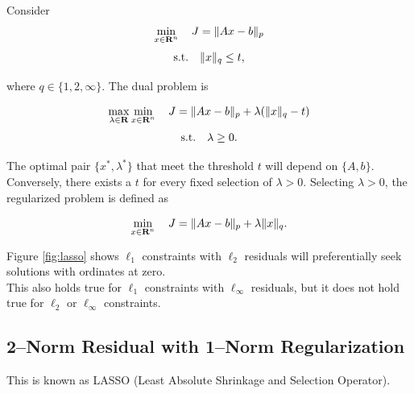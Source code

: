 \documentclass{article}
\begin{document}

    Consider
    \begin{align*}
        \min_{x\in\textbf{R}^n}\quad J = \|Ax-b\|_p
    \end{align*}
    \begin{align*}
        \text{s.t.}\quad \|x\|_q\leq t,
    \end{align*}

    where $q\in\{1,2,\infty\}$.  The dual problem is \cite{KKT}

    \begin{align*}
        \max_{\lambda\in\textbf{R}}\min_{x\in\textbf{R}^n}\quad J = \|Ax-b\|_p+\lambda (\|x\|_q - t)
    \end{align*}
    \begin{align*}
        \text{s.t.}\quad \lambda\geq 0.
    \end{align*}

    The optimal pair $\{x^*,\lambda^*\}$ that meet the threshold $t$ will depend on $\{A,b\}$.  
    Conversely, there exists a $t$ for every fixed selection of $\lambda>0$.  Selecting
    $\lambda>0$, the regularized problem is defined as

    \begin{align*}
        \min_{x\in\textbf{R}^n}\quad J = \|Ax-b\|_p+\lambda\|x\|_q.
    \end{align*}

    Figure \ref{fig:lasso} shows $\ell_1$ constraints with $\ell_2$ residuals will
    preferentially seek solutions with ordinates at zero. \\
    This also holds true for $\ell_1$ constraints with $\ell_\infty$ residuals, but
    it does not hold true for $\ell_2$ or $\ell_\infty$ constraints.

\subsection{2--Norm Residual with 1--Norm Regularization}

    This is known as LASSO (Least Absolute Shrinkage and Selection Operator).\\ 
\end{document}
